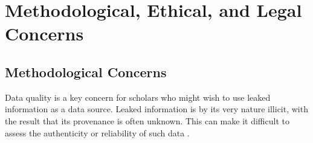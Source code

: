 \documentclass[12pt]{article}
\begin{document}



\section{Methodological, Ethical, and Legal Concerns}

\subsection{Methodological Concerns}

Data quality is a key concern for scholars who might wish to use leaked information as a data source. 
Leaked information is by its very nature illicit, with the result that its provenance is often unknown. 
This can make it difficult to assess the authenticity 
or reliability of such data \citep{kelly2012wikileaks:}.
\end{document}
